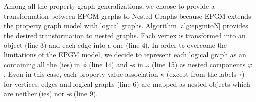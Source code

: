 Among all the property graph generalizations, we choose to provide a transformation between EPGM graphs to Nested Graphs because EPGM extends the property graph model with logical graphs. Algorithm \vref{alg:epgmtoN} provides the desired transformation to nested graphs. Each vertex is transformed into an \ONTA  object (line 3) and each edge into a \RELA one (line 4). In order to overcome the limitations of the EPGM model, we decide to represent each logical graph as an \ONTA containing all the \ONTA(ies) in $\phi$ (line 14) and \RELA-s in $\omega$ (line 15) as nested components $\varphi$. Even in this case, each property value association $\kappa$ (except from the labels $\tau$) for vertices, edges and logical graphs (line 6) are mapped as nested objects which are neither \ONTA(ies) nor \RELA-s (line 9). 


%
